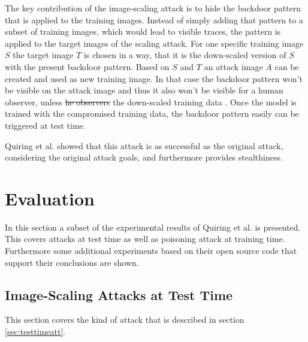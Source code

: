 \documentclass[sigconf]{acmart}
\providecommand{\DIFadd}[1]{{\protect\color{blue}\uwave{#1}}} %
\providecommand{\DIFdel}[1]{{\protect\color{red}\sout{#1}}}                      %
\providecommand{\DIFaddbegin}{} %
\providecommand{\DIFaddend}{} %
\providecommand{\DIFdelbegin}{} %
\providecommand{\DIFdelend}{} %
\begin{document}
The key contribution of the image-scaling attack is to hide the backdoor pattern that is applied to the training images.
Instead of simply adding that pattern to a subset of training images, which would lead to visible traces, the pattern is applied to the target images of the scaling attack.
For one specific training image $S$ the target image $T$ is chosen in a way, that it is the down-scaled version of $S$ with the present backdoor pattern.
Based on $S$ and $T$ an attack image $A$ can be created and used as new training image.
In that case the backdoor pattern won't be visible on the attack image and thus it also won't be visible for a human observer, unless \DIFdelbegin \DIFdel{he observers }\DIFdelend \DIFaddbegin \DIFadd{the }\DIFaddend the down-scaled training data \DIFaddbegin \DIFadd{is observed}\DIFaddend .
Once the model is trained with the compromised training data, the backdoor pattern easily can be triggered at test time.

Quiring et al. showed that this attack is as successful as the original attack, considering the original attack goals, and furthermore provides stealthiness.

\section{Evaluation}
In this section a subset of the experimental results of Quiring et al.\cite{imgscale, imgscalepoison} is presented.
This covers attacks at test time as well as poisoning attack at training time.
Furthermore some additional experiments based on their open source code that support their conclusions are shown.

\subsection{Image-Scaling Attacks at Test Time}
This section covers the kind of attack that is described in section \ref{sec:testtimeatt}.
\end{document}
